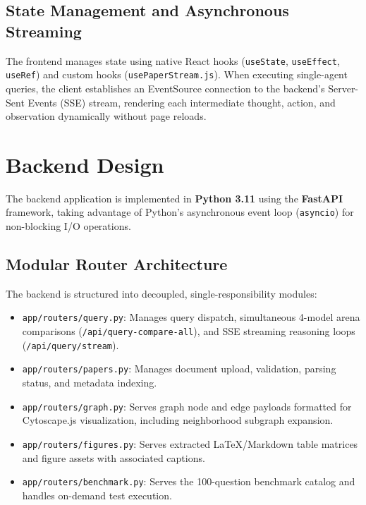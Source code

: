 \documentclass[12pt,a4paper,oneside]{report}
\begin{document}
\subsection{State Management and Asynchronous Streaming}
The frontend manages state using native React hooks (\texttt{useState}, \texttt{useEffect}, \texttt{useRef}) and custom hooks (\texttt{usePaperStream.js}). When executing single-agent queries, the client establishes an EventSource connection to the backend's Server-Sent Events (SSE) stream, rendering each intermediate thought, action, and observation dynamically without page reloads.

\section{Backend Design}
The backend application is implemented in \textbf{Python 3.11} using the \textbf{FastAPI} framework, taking advantage of Python's asynchronous event loop (\texttt{asyncio}) for non-blocking I/O operations.

\subsection{Modular Router Architecture}
The backend is structured into decoupled, single-responsibility modules:
\begin{itemize}
    \item \texttt{app/routers/query.py}: Manages query dispatch, simultaneous 4-model arena comparisons (\texttt{/api/query-compare-all}), and SSE streaming reasoning loops (\texttt{/api/query/stream}).
    \item \texttt{app/routers/papers.py}: Manages document upload, validation, parsing status, and metadata indexing.
    \item \texttt{app/routers/graph.py}: Serves graph node and edge payloads formatted for Cytoscape.js visualization, including neighborhood subgraph expansion.
    \item \texttt{app/routers/figures.py}: Serves extracted LaTeX/Markdown table matrices and figure assets with associated captions.
    \item \texttt{app/routers/benchmark.py}: Serves the 100-question benchmark catalog and handles on-demand test execution.
\end{itemize}
\end{document}
